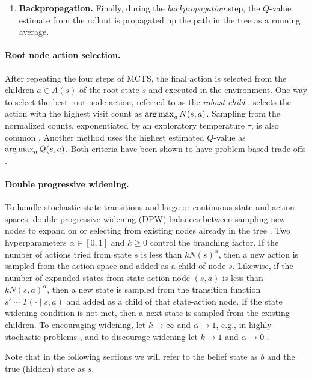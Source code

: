 \begin{enumerate}
    
    \item \textbf{Backpropagation.}\quad 
    Finally, during the \textit{backpropagation} step, the $Q$-value estimate from the rollout is propagated up the path in the tree as a running average.
\end{enumerate}


\paragraph{Root node action selection.}\label{par:root_selection}
After repeating the four steps of MCTS, the final action is selected from the children $a \in A(s)$ of the root state $s$ and executed in the environment.
One way to select the best root node action, referred to as the \textit{robust child} \cite{schadd2009monte, browne2012survey}, selects the action with the highest visit count as $\operatorname*{arg\,max}_a N(s,a)$.
Sampling from the normalized counts, exponentiated by an exploratory temperature $\tau$, is also common \cite{silver2017mastering}.
Another method uses the highest estimated $Q$-value as $\operatorname*{arg\,max}_a Q(s,a)$.
Both criteria have been shown to have problem-based trade-offs \cite{browne2012survey}.


\paragraph{Double progressive widening.}\label{sec:dpw}
To handle stochastic state transitions and large or continuous state and action spaces, double progressive widening (DPW) balances between sampling new nodes to expand on or selecting from existing nodes already in the tree \cite{couetoux2011continuous}.
Two hyperparameters $\alpha \in [0,1]$ and $k \ge 0$ control the branching factor.
If the number of actions tried from state $s$ is less than $kN(s)^\alpha$, then a new action is sampled from the action space and added as a child of node $s$.
Likewise, if the number of expanded states from state-action node $(s,a)$ is less than $kN(s,a)^\alpha$, then a new state is sampled from the transition function $s' \sim T(\cdot \mid s, a)$ and added as a child of that state-action node.
If the state widening condition is not met, then a next state is sampled from the existing children.
To encouraging widening, let $k \to \infty$ and $\alpha \to 1$, e.g., in highly stochastic problems \cite{sokota2021monte}, and to discourage widening let $k \to 1$ and $\alpha \to 0$ \cite{moss2020adaptive}.

Note that in the following sections we will refer to the belief state as $b$ and the true (hidden) state as $s$.



